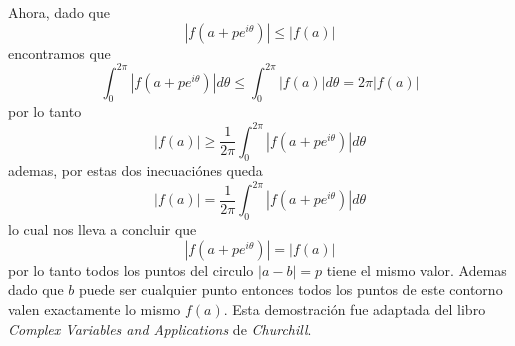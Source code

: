 \documentclass[12pt]{exam}
\begin{document}
Ahora, dado que $$|f(a+pe^{i\theta})|\le|f(a)|$$ encontramos que $$\int_0^{2\pi}|f(a + pe^{i\theta})|d\theta \le \int_0^{2\pi}|f(a)|d\theta=2\pi |f(a)|$$ por lo tanto $$|f(a)|\ge\frac{1}{2\pi}\int_0^{2\pi}|f(a+pe^{i\theta})|d\theta$$ ademas, por estas dos inecuaciónes queda $$|f(a)| = \frac{1}{2\pi}\int_0^{2\pi} |f(a + pe^{i\theta})|d\theta$$ lo cual nos lleva a concluir que $$|f(a+pe^{i\theta})|=|f(a)|$$ por lo tanto todos los puntos del circulo $|a - b| = p$ tiene el mismo valor. Ademas dado que $b$ puede ser cualquier punto entonces todos los puntos de este contorno valen exactamente lo mismo $f(a)$. Esta demostración fue adaptada del libro \textit{Complex Variables and Applications} de \textit{Churchill}.
\end{document}
